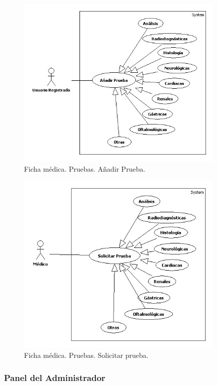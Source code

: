 				\begin{figure}[H]
				  \centering
				    \includegraphics[width=10cm]{img/jpg/casos_uso/Add_Prueba.jpg}
				  \caption{Ficha médica. Pruebas. Añadir Prueba.}
				  \label{fig:pruebas_add_fic}
				\end{figure}
				
				\begin{figure}[H]
				  \centering
				    \includegraphics[width=10cm]{img/jpg/casos_uso/Solicitar_Prueba.jpg}
				  \caption{Ficha médica. Pruebas. Solicitar prueba.}
				  \label{fig:pruebas_sol_fic}
				\end{figure}
			
	
		\subsubsection{Panel del Administrador} %
		\label{sec:panel_del_administrador}
		
